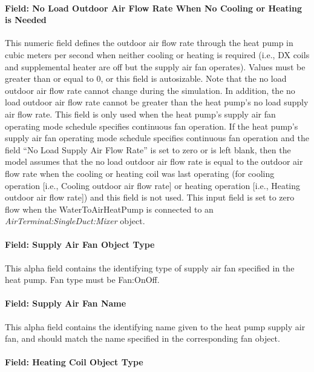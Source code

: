 \paragraph{Field: No Load Outdoor Air Flow Rate When No Cooling or Heating is Needed}\label{field-no-load-outdoor-air-flow-rate-when-no-cooling-or-heating-is-needed-000}

This numeric field defines the outdoor air flow rate through the heat pump in cubic meters per second when neither cooling or heating is required (i.e., DX coils and supplemental heater are off but the supply air fan operates). Values must be greater than or equal to 0, or this field is autosizable. Note that the no load outdoor air flow rate cannot change during the simulation. In addition, the no load outdoor air flow rate cannot be greater than the heat pump's no load supply air flow rate. This field is only used when the heat pump's supply air fan operating mode schedule specifies continuous fan operation. If the heat pump's supply air fan operating mode schedule specifies continuous fan operation and the field ``No Load Supply Air Flow Rate'' is set to zero or is left blank, then the model assumes that the no load outdoor air flow rate is equal to the outdoor air flow rate when the cooling or heating coil was last operating (for cooling operation {[}i.e., Cooling outdoor air flow rate{]} or heating operation {[}i.e., Heating outdoor air flow rate{]}) and this field is not used. This input field is set to zero flow when the WaterToAirHeatPump is connected to an \textit{AirTerminal:SingleDuct:Mixer} object.

\paragraph{Field: Supply Air Fan Object Type}\label{field-supply-air-fan-object-type-7}

This alpha field contains the identifying type of supply air fan specified in the heat pump. Fan type must be Fan:OnOff.

\paragraph{Field: Supply Air Fan Name}\label{field-supply-air-fan-name-6}

This alpha field contains the identifying name given to the heat pump supply air fan, and should match the name specified in the corresponding fan object.

\paragraph{Field: Heating Coil Object Type}\label{field-heating-coil-object-type-5-000}

